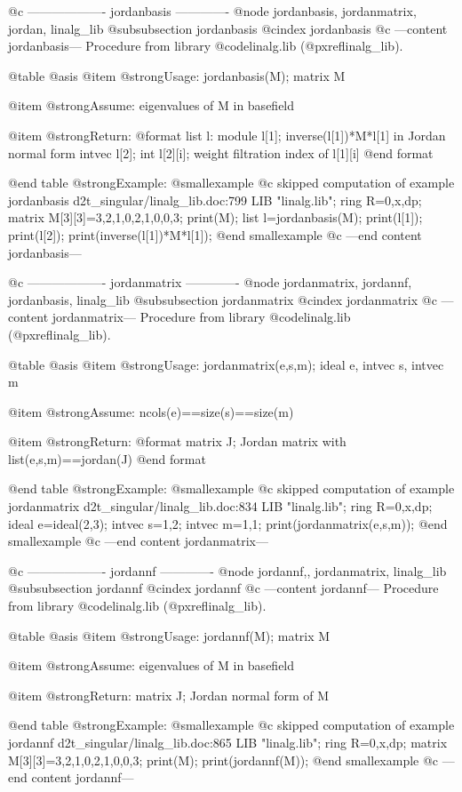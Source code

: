 @c ------------------- jordanbasis -------------
@node jordanbasis, jordanmatrix, jordan, linalg_lib
@subsubsection jordanbasis
@cindex jordanbasis
@c ---content jordanbasis---
Procedure from library @code{linalg.lib} (@pxref{linalg_lib}).

@table @asis
@item @strong{Usage:}
jordanbasis(M); matrix M

@item @strong{Assume:}
eigenvalues of M in basefield

@item @strong{Return:}
@format
list l:
  module l[1];  inverse(l[1])*M*l[1] in Jordan normal form
  intvec l[2]; 
    int l[2][i];  weight filtration index of l[1][i]
@end format

@end table
@strong{Example:}
@smallexample
@c skipped computation of example jordanbasis d2t_singular/linalg_lib.doc:799 
LIB "linalg.lib";
ring R=0,x,dp;
matrix M[3][3]=3,2,1,0,2,1,0,0,3;
print(M);
list l=jordanbasis(M);
print(l[1]);
print(l[2]);
print(inverse(l[1])*M*l[1]);
@end smallexample
@c ---end content jordanbasis---

@c ------------------- jordanmatrix -------------
@node jordanmatrix, jordannf, jordanbasis, linalg_lib
@subsubsection jordanmatrix
@cindex jordanmatrix
@c ---content jordanmatrix---
Procedure from library @code{linalg.lib} (@pxref{linalg_lib}).

@table @asis
@item @strong{Usage:}
jordanmatrix(e,s,m); ideal e, intvec s, intvec m

@item @strong{Assume:}
ncols(e)==size(s)==size(m)

@item @strong{Return:}
@format
matrix J;  Jordan matrix with list(e,s,m)==jordan(J)
@end format

@end table
@strong{Example:}
@smallexample
@c skipped computation of example jordanmatrix d2t_singular/linalg_lib.doc:834 
LIB "linalg.lib";
ring R=0,x,dp;
ideal e=ideal(2,3);
intvec s=1,2;
intvec m=1,1;
print(jordanmatrix(e,s,m));
@end smallexample
@c ---end content jordanmatrix---

@c ------------------- jordannf -------------
@node jordannf,, jordanmatrix, linalg_lib
@subsubsection jordannf
@cindex jordannf
@c ---content jordannf---
Procedure from library @code{linalg.lib} (@pxref{linalg_lib}).

@table @asis
@item @strong{Usage:}
jordannf(M); matrix M

@item @strong{Assume:}
eigenvalues of M in basefield

@item @strong{Return:}
matrix J; Jordan normal form of M

@end table
@strong{Example:}
@smallexample
@c skipped computation of example jordannf d2t_singular/linalg_lib.doc:865 
LIB "linalg.lib";
ring R=0,x,dp;
matrix M[3][3]=3,2,1,0,2,1,0,0,3;
print(M);
print(jordannf(M));
@end smallexample
@c ---end content jordannf---
